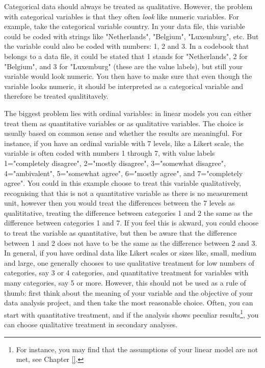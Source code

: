 Categorical data should always be treated as qualitative. However, the problem with  categorical variables is that they often \textit{look} like numeric variables. For example, take the categorical variable country. In your data file, this variable could be coded with strings like "Netherlands", "Belgium", "Luxemburg", etc. But the variable could also be coded with numbers: 1, 2 and 3. In a codebook that belongs to a data file, it could be stated that 1 stands for "Netherlands", 2 for "Belgium", and 3 for "Luxemburg" (these are the value labels), but still your variable would look numeric. You then have to make sure that even though the variable looks numeric, it should be interpreted as a categorical variable and therefore be treated qualititavely. 

The biggest problem lies with ordinal variables: in linear models you can either treat them as quantitative variables or as qualitative variables. The choice is usually based on common sense and whether the results are meaningful. For instance, if you have an ordinal variable with 7 levels, like a Likert scale, the variable is often coded with numbers 1 through 7, with value labels 1="completely disagree", 2="mostly disagree", 3="somewhat disagree", 4="ambivalent", 5="somewhat agree", 6="mostly agree", and 7="completely agree". You could in this example choose to treat this variable qualitatively, recognising that this is not a quantitative variable as there is no measurement unit, however then you would treat the differences between the 7 levels as qualititative, treating the difference between categories 1 and 2 the same as the difference between categories 1 and 7. If you feel this is akward, you could choose to treat the variable as quantitative, but then be aware that the difference between 1 and 2 does not have to be the same as the difference between 2 and 3. In general, if you have ordinal data like Likert scales or sizes like, small, medium and large, one generally chooses to use qualitative treatment for low numbers of categories, say 3 or 4 categories, and quantitative treatment for variables with many categories, say 5 or more. However, this should not be used as a rule of thumb: first think about the meaning of your variable and the objective of your data analysis project, and then take the most reasonable choice. Often, you can start with quantitative treatment, and if the analysis shows peculiar results\footnote{For instance, you may find that the assumptions of your linear model are not met, see Chapter \ref{}.}, you can choose qualitative treatment in secondary analyses.

